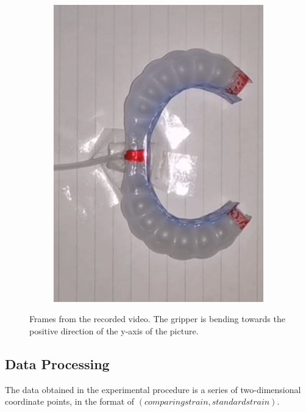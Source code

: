 \documentclass[conference]{IEEEtran}
\begin{document}
\begin{figure}[htbp]
\begin{subfigure}[b]{0.25\linewidth}
    \includegraphics[width=\linewidth]{pics/变形3.png}
    \caption{}
    \label{fig:image3}
  \end{subfigure}
  \caption{Frames from the recorded video. The gripper is bending towards the positive direction of the y-axis of the picture.}
  \label{fig:three_images}
\end{figure}

\subsection{Data Processing}
\label{Processing}

The data obtained in the experimental procedure is a series of two-dimensional coordinate points, in the format of $(comparing strain, standard strain)$.
\end{document}
